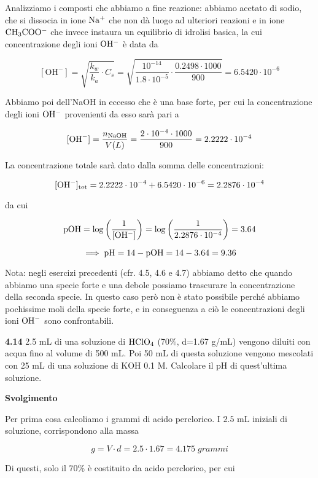 Analizziamo i composti che abbiamo a fine reazione: abbiamo acetato di sodio, che si dissocia in ione $\rm Na^+$ che non dà luogo ad ulteriori reazioni e in ione $\rm CH_3COO^-$ che invece instaura un equilibrio di idrolisi basica, la cui concentrazione degli ioni $\rm OH^-$ è data da

$$[\text{OH}^-]
=\sqrt{\frac{k_w}{k_a}\cdot C_s}
=\sqrt{\frac{10^{-14}}{1.8 \cdot 10^{-5}} \cdot \frac{0.2498 \cdot 1000}{900}}
=6.5420 \cdot 10^{-6}$$

Abbiamo poi dell'NaOH in eccesso che è una base forte, per cui la concentrazione degli ioni $\rm OH^-$ provenienti da esso sarà pari a

$$[\text{OH}^-]=\frac{n_{\rm NaOH}}{V(L)}
=\frac{2 \cdot 10^{-4} \cdot 1000}{900}=2.2222 \cdot 10^{-4}$$

La concentrazione totale sarà dato dalla somma delle concentrazioni:

$$\rm [OH^-]_{tot}=2.2222 \cdot 10^{-4} + 6.5420 \cdot 10^{-6}
=2.2876 \cdot 10^{-4}$$

da cui

$$\rm pOH=\log{\left(\frac{1}{[OH^-]}\right)}
=\log{\left(\frac{1}{2.2876 \cdot 10^{-4}}\right)}=3.64$$

$$\implies \rm pH=14-pOH=14-3.64=9.36$$

Nota: negli esercizi precedenti (cfr. 4.5, 4.6 e 4.7) abbiamo detto che quando abbiamo una specie forte e una debole possiamo trascurare la concentrazione della seconda specie. In questo caso però non è stato possibile perché abbiamo pochissime moli della specie forte, e in conseguenza a ciò le concentrazioni degli ioni $\rm OH^-$ sono confrontabili.

\vspace{0.2cm}\textbf{4.14} 2.5 mL di una soluzione di $\rm HClO_4$ (70\%, d=1.67 g/mL) vengono diluiti con acqua fino al
volume di 500 mL. Poi 50 mL di questa soluzione vengono mescolati con 25 mL di una soluzione di KOH 0.1 M. Calcolare il pH di quest'ultima soluzione.

\vspace{0.2cm}\large\textbf{Svolgimento}\normalsize

\vspace{0.2cm}Per prima cosa calcoliamo i grammi di acido perclorico. I $2.5$ mL iniziali di soluzione, corrispondono alla massa

$$g=V \cdot d=2.5 \cdot 1.67=4.175\;grammi$$

Di questi, solo il 70\% è costituito da acido perclorico, per cui

